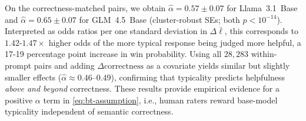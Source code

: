 On the correctness-matched pairs, we obtain $\hat{\alpha}=0.57\pm0.07$ for Llama~3.1~Base and $\hat{\alpha}=0.65\pm0.07$ for GLM~4.5~Base (cluster-robust SEs; both $p<10^{-14}$). Interpreted as odds ratios per one standard deviation in $\Delta\bar{\ell}$, this corresponds to $1.42$-$1.47\times$ higher odds of the more typical response being judged more helpful, a 17-19 percentage point increase in win probability. Using all $28{,}283$ within-prompt pairs and adding $\Delta\text{correctness}$ as a covariate yields similar but slightly smaller effects ($\hat{\alpha}\approx0.46$–$0.49$), confirming that typicality predicts helpfulness \emph{above and beyond} correctness. These results provide empirical evidence for a positive $\alpha$ term in \eqref{eq:bt-assumption}, i.e., human raters reward base-model typicality independent of semantic correctness.







